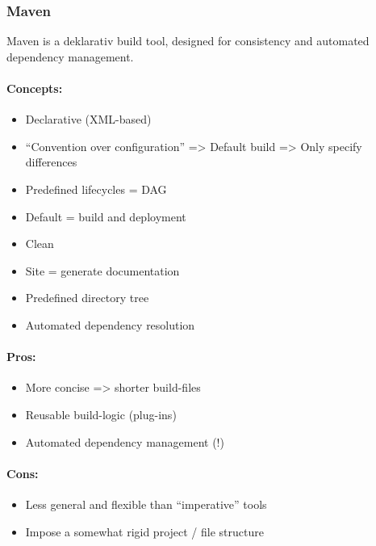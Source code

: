 \subsubsection{Maven}

Maven is a deklarativ build tool, designed for consistency and automated dependency management.

\paragraph{Concepts:}
\begin{itemize}
	\item Declarative (XML-based)
	\item “Convention over configuration” => Default build => Only specify differences
	\item Predefined lifecycles = DAG
	\item Default = build and deployment
	\item Clean
	\item Site = generate documentation
	\item Predefined directory tree
	\item Automated dependency resolution
\end{itemize}

\paragraph{Pros:}
\begin{itemize}
	\item More concise => shorter build-files
	\item Reusable build-logic (plug-ins)
	\item Automated dependency management (!)
\end{itemize}

\paragraph{Cons:}
\begin{itemize}
	\item Less general and flexible than “imperative” tools
	\item Impose a somewhat rigid project / file structure
\end{itemize}

